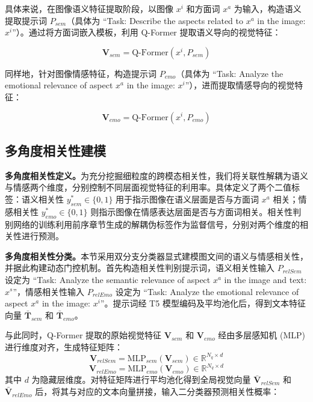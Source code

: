 具体来说，在图像语义特征提取阶段，以图像 $x^i$ 和方面词 $x^a$ 为输入，构造语义提取提示词 $P_{sem}$（具体为 “Task: Describe the aspects related to {$x^a$} in the image: {$x^i$}”）。通过将方面词嵌入模板，利用 Q-Former 提取语义导向的视觉特征：

\begin{equation}
\mathbf{V}_{sem} = \mathrm{Q\text{-}Former}(x^i, P_{sem})
\end{equation}

同样地，针对图像情感特征，构造提示词 $P_{emo}$（具体为 “Task: Analyze the emotional relevance of aspect {$x^a$} in the image: {$x^i$}”），进而提取情感导向的视觉特征：

\begin{equation}
\mathbf{V}_{emo} = \mathrm{Q\text{-}Former}(x^i, P_{emo})
\end{equation}

\subsection{多角度相关性建模}
\textbf{多角度相关性定义。}为充分挖掘细粒度的跨模态相关性，我们将关联性解耦为语义与情感两个维度，分别控制不同层面视觉特征的利用率。具体定义了两个二值标签：语义相关性 $y_{sem}^* \in \{0, 1\}$ 用于指示图像在语义层面是否与方面词 $x^a$ 相关；情感相关性 $y_{emo}^* \in \{0, 1\}$ 则指示图像在情感表达层面是否与方面词相关。相关性判别网络的训练利用前序章节生成的解耦伪标签作为监督信号，分别对两个维度的相关性进行预测。

\textbf{多角度相关性分类。}本节采用双分支分类器显式建模图文间的语义与情感相关性，并据此构建动态门控机制。首先构造相关性判别提示词，语义相关性输入 $P_{relSem}$ 设定为 “Task: Analyze the semantic relevance of aspect {$x^a$} in the image and text: {$x^s$}”，情感相关性输入 $P_{relEmo}$ 设定为 “Task: Analyze the emotional relevance of aspect {$x^a$} in the image: {$x^i$}”。提示词经 T5 模型编码及平均池化后，得到文本特征向量 $\bar{\mathbf{T}}_{sem}$ 和 $\bar{\mathbf{T}}_{emo}$。

与此同时，Q-Former 提取的原始视觉特征 $\mathbf{V}_{sem}$ 和 $\mathbf{V}_{emo}$ 经由多层感知机 (MLP) 进行维度对齐，生成特征矩阵：
\begin{equation}
\mathbf{V}_{relSem} = \text{MLP}_{sem}(\mathbf{V}_{sem}) \in \mathbb{R}^{N_q \times d}
\end{equation}
\begin{equation}
\mathbf{V}_{relEmo} = \text{MLP}_{emo}(\mathbf{V}_{emo}) \in \mathbb{R}^{N_q \times d}
\end{equation}
其中 $d$ 为隐藏层维度。对特征矩阵进行平均池化得到全局视觉向量 $\bar{\mathbf{V}}_{relSem}$ 和 $\bar{\mathbf{V}}_{relEmo}$ 后，将其与对应的文本向量拼接，输入二分类器预测相关性概率：

